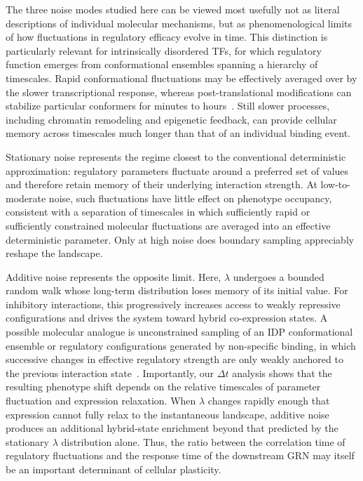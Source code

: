 \documentclass[11pt]{article}
\begin{document}
The three noise modes studied here can be viewed most usefully not as literal descriptions of individual molecular mechanisms, but as phenomenological limits of how fluctuations in regulatory efficacy evolve in time. This distinction is particularly relevant for intrinsically disordered TFs, for which regulatory function emerges from conformational ensembles spanning a hierarchy of timescales. Rapid conformational fluctuations may be effectively averaged over by the slower transcriptional response, whereas post-translational modifications can stabilize particular conformers for minutes to hours~\cite{Kulkarni2022, Kulkarni2019}. Still slower processes, including chromatin remodeling and epigenetic feedback, can provide cellular memory across timescales much longer than that of an individual binding event.

Stationary noise represents the regime closest to the conventional deterministic approximation: regulatory parameters fluctuate around a preferred set of values and therefore retain memory of their underlying interaction strength. At low-to-moderate noise, such fluctuations have little effect on phenotype occupancy, consistent with a separation of timescales in which sufficiently rapid or sufficiently constrained molecular fluctuations are averaged into an effective deterministic parameter. Only at high noise does boundary sampling appreciably reshape the landscape.

Additive noise represents the opposite limit. Here, $\lambda$ undergoes a bounded random walk whose long-term distribution loses memory of its initial value. For inhibitory interactions, this progressively increases access to weakly repressive configurations and drives the system toward hybrid co-expression states. A possible molecular analogue is unconstrained sampling of an IDP conformational ensemble or regulatory configurations generated by non-specific binding, in which successive changes in effective regulatory strength are only weakly anchored to the previous interaction state~\cite{Ferrie2022Structure-functionRegulation, Holehouse2023TheRegions}. Importantly, our $\Delta t$ analysis shows that the resulting phenotype shift depends on the relative timescales of parameter fluctuation and expression relaxation. When $\lambda$ changes rapidly enough that expression cannot fully relax to the instantaneous landscape, additive noise produces an additional hybrid-state enrichment beyond that predicted by the stationary $\lambda$ distribution alone. Thus, the ratio between the correlation time of regulatory fluctuations and the response time of the downstream GRN may itself be an important determinant of cellular plasticity.
\end{document}
